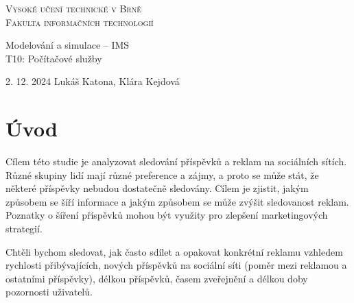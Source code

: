 \documentclass[11pt, a4paper]{article}
\begin{document}
\begin{titlepage}
    \begin{center}
        \textsc{\Huge Vysoké učení technické v Brně\\\vspace{0.5em}\huge Fakulta informačních technologií}
        
        {\LARGE Modelování a simulace -- IMS\\\vspace{0.5em}}
        {\Huge T10: Počítačové služby}
        
    \end{center}
    {\Large 2. 12. 2024 \hfill Lukáš Katona, Klára Kejdová}
\end{titlepage}

\newpage

\section{Úvod}

Cílem této studie je analyzovat sledování příspěvků a reklam na sociálních sítích.
Různé skupiny lidí mají různé preference a zájmy, a proto se může stát,
že některé příspěvky nebudou dostatečně sledovány. Cílem je zjistit,
jakým způsobem se šíří informace a jakým způsobem se může zvýšit sledovanost reklam. 
Poznatky o šíření příspěvků mohou být využity pro zlepšení marketingových strategií.

Chtěli bychom sledovat, jak často sdílet a opakovat konkrétní reklamu vzhledem rychlosti přibývajících, nových příspěvků na sociální síti
(poměr mezi reklamou a ostatními příspěvky), délkou příspěvků, časem zveřejnění a délkou doby pozornosti uživatelů.
\end{document}
